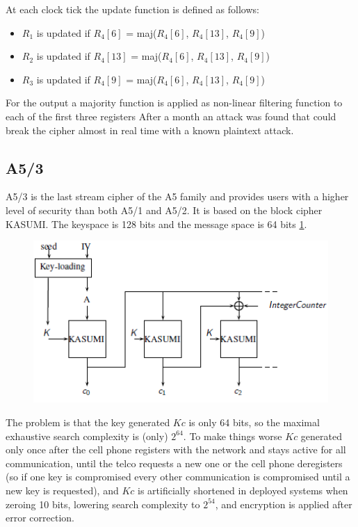 At each clock tick the update function is defined as follows:
\begin{itemize}
	\item $R_1$ is updated if $R_4[6]$ = maj($R_4[6]$, $R_4[13]$, $R_4[9]$)
	\item $R_2$ is updated if $R_4[13]$ = maj($R_4[6]$, $R_4[13]$, $R_4[9]$)
	\item $R_3$ is updated if $R_4[9]$ = maj($R_4[6]$, $R_4[13]$, $R_4[9]$)	
\end{itemize}

For the output a majority function is applied as non-linear filtering function to each of the first three registers
After a month an attack was found that could break the cipher almost in real time with a known plaintext attack.

\subsection{A5/3}
A5/3 is the last stream cipher of the A5 family and provides users with a higher level of security than both A5/1 and A5/2. It is based on the block cipher KASUMI. The keyspace is 128 bits and the message space is 64 bits \ref{fig:A53}.

\begin{figure}
	\centering
	\includegraphics[width=0.7\linewidth]{Images/Chapter2/A53}
	\caption{}
	\label{fig:A53}
\end{figure}

The problem is that the key generated $Kc$ is only 64 bits, so the maximal exhaustive search complexity is (only) $2^{64}$. To make things worse $Kc$ generated only once after the cell phone registers with the network and stays active for all communication, until the telco requests a new one or the cell phone deregisters (so if one key is compromised every other communication is compromised until a new key is requested), and $Kc$ is artificially shortened in deployed systems when zeroing 10 bits, lowering search complexity to $2^{54}$, and encryption is applied after error correction.


